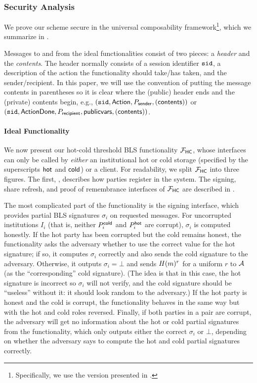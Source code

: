 \subsubsection{Security Analysis}\label{sec:security}

We prove our scheme secure in the universal composability framework\footnote{Specifically, we use the version presented in \cite{EPRINT:CLOS02}.}, which we summarize in .

Messages to and from the ideal functionalities consist of two pieces: a \emph{header} and the \emph{contents}. The header normally consists of a session identifier $\texttt{sid}$, a description of the action the functionality should take/has taken, and the sender/recipient. In this paper, we will use the convention of putting the message contents in parentheses so it is clear where the (public) header ends and the (private) contents begin, e.g., $(\texttt{sid}, \mathsf{Action}, P_{\sf sender}, (\mathsf{contents}))$ or $(\texttt{sid}, \mathsf{ActionDone}, P_{\sf recipient}, \mathsf{publicvars}, (\mathsf{contents}))$.

\paragraph{Ideal Functionality}




We now present our hot-cold threshold BLS functionality $\mathcal{F}_\mathsf{HC}$, whose interfaces can only be called by \emph{either} an institutional hot or cold storage (specified by the superscripts $\mathsf{hot}$ and $\mathsf{cold}$) or a client. For readability, we split $\mathcal{F}_\mathsf{HC}$ into three figures. The first, , describes how parties register in the system.
The signing, share refresh, and proof of remembrance interfaces of $\mathcal{F}_\mathsf{HC}$ are described in .

The most complicated part of the functionality is the signing interface, which provides partial BLS signatures $\sigma_i$ on requested messages. For uncorrupted institutions $I_i$ (that is, neither $P_i^{\mathsf{cold}}$ and $P_i^{\mathsf{hot}}$ are corrupt), $\sigma_i$ is computed honestly.
If the hot party has been corrupted but the cold remains honest, the functionality asks the adversary whether to use the correct value for the hot signature; if so, it computes $\sigma_i$ correctly and also sends the cold signature to the adversary. Otherwise, it outputs $\sigma_i = \bot$ and sends $H(m)^r$ for a uniform $r$ to $\mathcal{A}$ (as the ``corresponding'' cold signature). (The idea is that in this case, the hot signature is incorrect so $\sigma_i$ will not verify, and the cold signature should be ``useless'' without it: it should look random to the adversary.) 
If the hot party is honest and the cold is corrupt, the functionality behaves in the same way but with the hot and cold roles reversed. 
Finally, if both parties in a pair are corrupt, the adversary will get no information about the hot or cold partial signatures from the functionality, which only outputs either the correct $\sigma_i$ or $\bot$, depending on whether the adversary says to compute the hot and cold partial signatures correctly.


